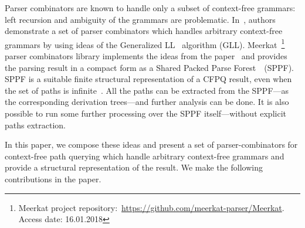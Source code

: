 Parser combinators are known to handle only a subset of context-free grammars: left recursion and ambiguity of the grammars are problematic. 
In~\cite{Meerkat}, authors demonstrate a set of parser combinators which handles arbitrary context-free grammars by using ideas of the Generalized LL~\cite{scott2010gll} algorithm (GLL). 
Meerkat~\footnote{Meerkat project repository:~\url{https://github.com/meerkat-parser/Meerkat}. Access date: 16.01.2018} parser combinators library implements the ideas from the paper~\cite{Meerkat} and provides the parsing result in a compact form as a Shared Packed Parse Forest~\cite{SPPF}~(SPPF).
SPPF is a suitable finite structural representation of a CFPQ result, even when the set of paths is infinite~\cite{GrigorevR16}. 
All the paths can be extracted from the SPPF---as the corresponding derivation trees---and further analysis can be done. 
It is also possible to run some further processing over the SPPF itself---without explicit paths extraction.


In this paper, we compose these ideas and present a set of parser-combinators for context-free path querying which handle arbitrary context-free grammars and provide a structural representation of the result. 
We make the following contributions in the paper.


